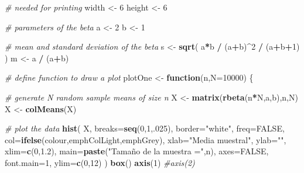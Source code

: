 \documentclass[spanish,]{book}
\newenvironment{Shaded}{\begin{snugshade}}{\end{snugshade}}
\newcommand{\KeywordTok}[1]{\textcolor[rgb]{0.13,0.29,0.53}{\textbf{#1}}}
\newcommand{\DataTypeTok}[1]{\textcolor[rgb]{0.13,0.29,0.53}{#1}}
\newcommand{\DecValTok}[1]{\textcolor[rgb]{0.00,0.00,0.81}{#1}}
\newcommand{\FloatTok}[1]{\textcolor[rgb]{0.00,0.00,0.81}{#1}}
\newcommand{\StringTok}[1]{\textcolor[rgb]{0.31,0.60,0.02}{#1}}
\newcommand{\CommentTok}[1]{\textcolor[rgb]{0.56,0.35,0.01}{\textit{#1}}}
\newcommand{\OtherTok}[1]{\textcolor[rgb]{0.56,0.35,0.01}{#1}}
\newcommand{\ControlFlowTok}[1]{\textcolor[rgb]{0.13,0.29,0.53}{\textbf{#1}}}
\newcommand{\OperatorTok}[1]{\textcolor[rgb]{0.81,0.36,0.00}{\textbf{#1}}}
\newcommand{\NormalTok}[1]{#1}
\begin{document}
\begin{Shaded}
\begin{Highlighting}[]
    \CommentTok{# needed for printing}
\NormalTok{    width <-}\StringTok{ }\DecValTok{6}
\NormalTok{    height <-}\StringTok{ }\DecValTok{6} 
    
    \CommentTok{# parameters of the beta}
\NormalTok{    a <-}\StringTok{ }\DecValTok{2}
\NormalTok{    b <-}\StringTok{ }\DecValTok{1}
    
    \CommentTok{# mean and standard deviation of the beta}
\NormalTok{    s <-}\StringTok{ }\KeywordTok{sqrt}\NormalTok{( a}\OperatorTok{*}\NormalTok{b }\OperatorTok{/}\StringTok{ }\NormalTok{(a}\OperatorTok{+}\NormalTok{b)}\OperatorTok{^}\DecValTok{2} \OperatorTok{/}\StringTok{ }\NormalTok{(a}\OperatorTok{+}\NormalTok{b}\OperatorTok{+}\DecValTok{1}\NormalTok{) )}
\NormalTok{    m <-}\StringTok{ }\NormalTok{a }\OperatorTok{/}\StringTok{ }\NormalTok{(a}\OperatorTok{+}\NormalTok{b)}
    
    \CommentTok{# define function to draw a plot}
\NormalTok{    plotOne <-}\StringTok{ }\ControlFlowTok{function}\NormalTok{(n,}\DataTypeTok{N=}\DecValTok{10000}\NormalTok{) \{}
        
        \CommentTok{# generate N random sample means of size n}
\NormalTok{        X <-}\StringTok{ }\KeywordTok{matrix}\NormalTok{(}\KeywordTok{rbeta}\NormalTok{(n}\OperatorTok{*}\NormalTok{N,a,b),n,N)}
\NormalTok{        X <-}\StringTok{ }\KeywordTok{colMeans}\NormalTok{(X)}
        
        \CommentTok{# plot the data}
        \KeywordTok{hist}\NormalTok{( X, }\DataTypeTok{breaks=}\KeywordTok{seq}\NormalTok{(}\DecValTok{0}\NormalTok{,}\DecValTok{1}\NormalTok{,.}\DecValTok{025}\NormalTok{), }\DataTypeTok{border=}\StringTok{"white"}\NormalTok{, }\DataTypeTok{freq=}\OtherTok{FALSE}\NormalTok{,}
            \DataTypeTok{col=}\KeywordTok{ifelse}\NormalTok{(colour,emphColLight,emphGrey),}
            \DataTypeTok{xlab=}\StringTok{"Media muestral"}\NormalTok{, }\DataTypeTok{ylab=}\StringTok{""}\NormalTok{, }\DataTypeTok{xlim=}\KeywordTok{c}\NormalTok{(}\DecValTok{0}\NormalTok{,}\FloatTok{1.2}\NormalTok{),}
            \DataTypeTok{main=}\KeywordTok{paste}\NormalTok{(}\StringTok{"Tamaño de la muestra ="}\NormalTok{,n), }\DataTypeTok{axes=}\OtherTok{FALSE}\NormalTok{,}
            \DataTypeTok{font.main=}\DecValTok{1}\NormalTok{, }\DataTypeTok{ylim=}\KeywordTok{c}\NormalTok{(}\DecValTok{0}\NormalTok{,}\DecValTok{12}\NormalTok{)}
\NormalTok{        )}
        \KeywordTok{box}\NormalTok{()}
        \KeywordTok{axis}\NormalTok{(}\DecValTok{1}\NormalTok{)}
        \CommentTok{#axis(2)}
        

\end{Highlighting}
\end{Shaded}
\end{document}
